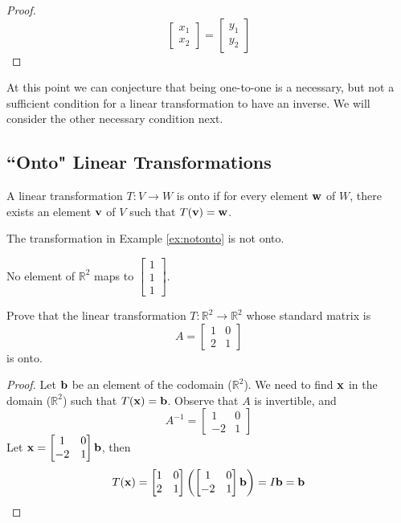 \documentclass{ximera}
\renewcommand{\vec}[1]{{\bf #1}}
\newcommand{\RR}{\mathbb{R}}
\begin{document}
\begin{example}
\begin{proof}
$$\begin{bmatrix}x_1\\x_2\end{bmatrix}=\begin{bmatrix}y_1\\y_2\end{bmatrix}$$
\end{proof}
\end{example}

At this point we can conjecture that being one-to-one is a necessary, but not a sufficient condition for a linear transformation to have an inverse.  We will consider the other necessary condition next.

\subsection*{``Onto" Linear Transformations}

\begin{definition}[Onto]\label{def:onto} A linear transformation $T:V\rightarrow W$ is onto if for every element $\vec{w}$ of $W$, there exists an element $\vec{v}$ of $V$ such that $T(\vec{v})=\vec{w}$.
\end{definition}

\begin{example}
The transformation in Example \ref{ex:notonto} is not onto.
\begin{explanation}
No element of $\RR^2$ maps to $\begin{bmatrix}1\\1\\1\end{bmatrix}$.
\end{explanation}
\end{example}

\begin{example} Prove that the linear transformation $T:\RR^2\rightarrow \RR^2$ whose standard matrix is $$A=\begin{bmatrix}1&0\\2&1\end{bmatrix}$$ is onto.
\begin{proof} Let $\vec{b}$ be an element of the codomain ($\RR^2$).  We need to find $\vec{x}$ in the domain ($\RR^2$) such that $T(\vec{x})=\vec{b}$. 
Observe that $A$ is invertible, and $$A^{-1}=\begin{bmatrix}1&0\\-2&1\end{bmatrix}$$
 Let $\vec{x}=\begin{bmatrix}1&0\\-2&1\end{bmatrix}\vec{b}$, then 
 $$T(\vec{x})=\begin{bmatrix}1&0\\2&1\end{bmatrix}\left(\begin{bmatrix}1&0\\-2&1\end{bmatrix}\vec{b}\right)=I\vec{b}=\vec{b}$$
\end{proof}
\end{example}
\end{document}
